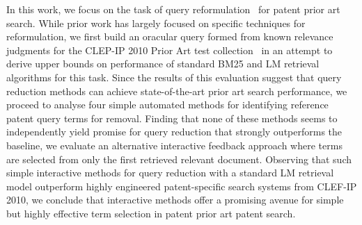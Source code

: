 %
%
In this work, we focus on the task of query
reformulation~\cite{INSERT_RELEVANT_CITATIONS_HERE} for patent prior
art search.  While prior work has largely focused on specific
techniques for reformulation, we first build an oracular query formed
from known relevance judgments for the CLEP-IP 2010 Prior Art test
collection~\cite{CITATION_OR_FOOTNOTE_HERE} in an attempt to derive upper
bounds on performance of standard BM25 and LM retrieval algorithms for
this task.  Since the results of this evaluation suggest that query
reduction methods can achieve state-of-the-art prior art search performance, we
proceed to analyse four simple automated methods for identifying
reference patent query terms for removal.  Finding that none of these methods
seems to independently yield promise for query reduction that strongly
outperforms the baseline, we evaluate an alternative interactive
feedback approach where terms are selected from only the first
retrieved relevant document.  Observing that such simple interactive
methods for query reduction with a standard LM retrieval model
outperform highly engineered patent-specific search systems from
CLEF-IP 2010, we conclude that interactive methods offer a promising
avenue for simple but highly effective term selection in patent prior
art patent search.

\begin{comment}
In this work, we mainly emphasized on the problem from the term analysis perspective which ended in an effective minimal relevance feedback method. We investigated the influence of term selection on retrieval performance on the CLEF-IP Prior Art test collection, starting with the Description section of the reference patent and using LM and BM25 scoring functions. We found that an oracular relevance feedback system which extracts terms from the judged relevant documents far outperforms the baseline and  performs twice as well on MAP as the best competitor in CLEF-IP 2010.  We find a very clear term selection value threshold for use when choosing terms.  A much more realistic approach in which feedback terms are extracted only from the first relevant document retrieved, still outperforms the winner.   We noticed that most of the useful feedback terms are actually present in the original query and hypothesized that the baseline system could be substantially improved by removing negative query terms.  We tried four different approaches to identifying negative terms but were unable to improve on the baseline performance with any of them.
\end{comment}


